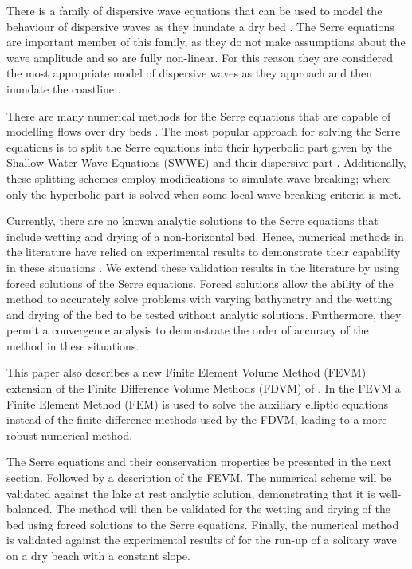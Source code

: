 \documentclass[AMA,STIX1COL]{WileyNJD-v2}
\begin{document}
There is a family of dispersive wave equations that can be used to model the behaviour of dispersive waves as they inundate a dry bed \cite{Bonneton-Lannes-2009-16601}. The Serre equations \cite{Serre-F-1953-857} are important member of this family, as they do not make assumptions about the wave amplitude and so are fully non-linear. For this reason they are considered the most appropriate model of dispersive waves as they approach and then inundate the coastline \cite{Bonneton-Lannes-2009-16601}.

There are many numerical methods for the Serre equations that are capable of modelling flows over dry beds \cite{Tissier-2011,Li-2014-169,Filippini-etal-2016-381,DoCarmo-2019-125}. The most popular approach for solving the Serre equations is to split the Serre equations into their hyperbolic part given by the Shallow Water Wave Equations (SWWE) and their dispersive part \cite{Tissier-2011,Filippini-etal-2016-381,DoCarmo-2019-125}. Additionally, these splitting schemes employ modifications to simulate wave-breaking; where only the hyperbolic part is solved when some local wave breaking criteria is met. 

Currently, there are no known analytic solutions to the Serre equations that include wetting and drying of a non-horizontal bed. Hence, numerical methods in the literature have relied on experimental results to demonstrate their capability in these situations \cite{Tissier-2011,Li-2014-169,Filippini-etal-2016-381,DoCarmo-2019-125}. We extend these validation results in the literature by using forced solutions of the Serre equations. Forced solutions allow the ability of the method to accurately solve problems with varying bathymetry and the wetting and drying of the bed to be tested without analytic solutions. Furthermore, they permit a convergence analysis to demonstrate the order of accuracy of the method in these situations. 

This paper also describes a new Finite Element Volume Method (FEVM) extension of the Finite Difference Volume Methods (FDVM) of \citet{Zoppou-etal-2017}. In the FEVM a Finite Element Method (FEM) is used to solve the auxiliary elliptic equations instead of the finite difference methods used by the FDVM, leading to a more robust numerical method.

The Serre equations and their conservation properties be presented in the next section. Followed by a description of the FEVM. The numerical scheme will be validated against the lake at rest analytic solution, demonstrating that it is well-balanced. The method will then be validated for the wetting and drying of the bed using forced solutions to the Serre equations. Finally, the numerical method is validated against the experimental results of \citet{Synolakis-1987-523} for the run-up of a solitary wave on a dry beach with a constant slope.
\end{document}

